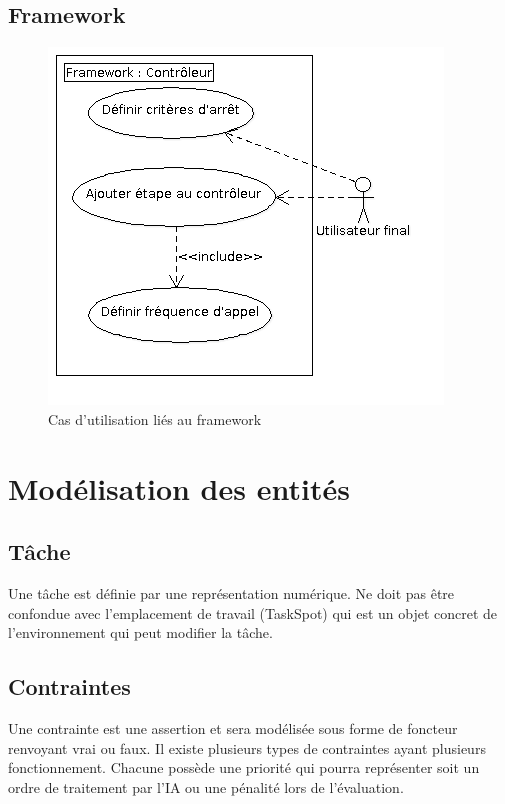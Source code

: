 \subsection{Framework}
\begin{figure}[!h]\centering
   \includegraphics[scale=0.5]{images/uc_framework.png}
   \caption{\label{uc_main} Cas d'utilisation liés au framework}
\end{figure}
%
\newpage
\section{Modélisation des entités}

\subsection{Tâche}

Une tâche est définie par une représentation numérique. Ne doit pas être confondue avec l'emplacement de travail (TaskSpot) qui est un objet concret de l'environnement qui peut modifier la  tâche.

\subsection{Contraintes}

Une contrainte est une assertion et sera modélisée sous forme de foncteur renvoyant vrai ou faux.
Il existe plusieurs types de contraintes ayant plusieurs fonctionnement. Chacune possède une priorité qui pourra représenter soit un ordre de traitement par l'IA ou une pénalité lors de l'évaluation. \\

